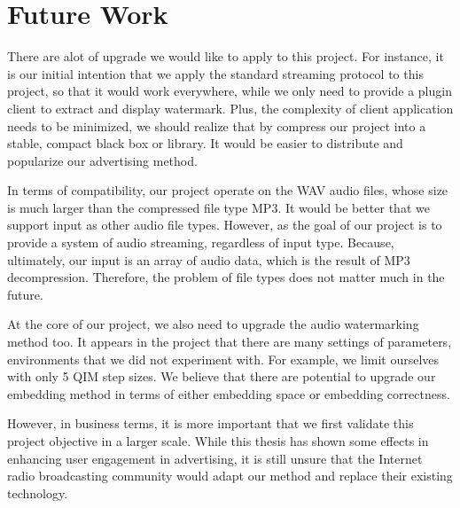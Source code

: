 \section{Future Work}
There are alot of upgrade we would like to apply to this project. For instance, it is our initial intention that we apply the standard streaming protocol to this project, so that it would work everywhere, while we only need to provide a plugin client to extract and display watermark. Plus, the complexity of client application needs to be minimized, we should realize that by compress our project into a stable, compact black box or library. It would be easier to distribute and popularize our advertising method.

In terms of compatibility, our project operate on the WAV audio files, whose size is much larger than the compressed file type MP3. It would be better that we support input as other audio file types. However, as the goal of our project is to provide a system of audio streaming, regardless of input type. Because, ultimately, our input is an array of audio data, which is the result of MP3 decompression. Therefore, the problem of file types does not matter much in the future.

At the core of our project, we also need to upgrade the audio watermarking method too. It appears in the project that there are many settings of parameters, environments that we did not experiment with. For example, we limit ourselves with only 5 QIM step sizes. We believe that there are potential to upgrade our embedding method in terms of either embedding space or embedding correctness.

However, in business terms, it is more important that we first validate this project objective in a larger scale. While this thesis has shown some effects in enhancing user engagement in advertising, it is still unsure that the Internet radio broadcasting community would adapt our method and replace their existing technology.

